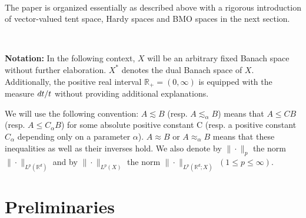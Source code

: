 \documentclass[oneside,english,a4wide]{amsart}
\numberwithin{equation}{section}
\numberwithin{figure}{section}
\theoremstyle{plain}
\theoremstyle{plain}
\theoremstyle{definition}
\theoremstyle{plain}
\theoremstyle{remark}
\theoremstyle{definition}
\theoremstyle{remark}
\theoremstyle{definition}
\newcommand{\real}{{\mathbb R}}
\newcommand{\F}{{\mathcal F}}
\newcommand{\8}{+\infty}
\renewcommand{\1}{\mathbbm{1}}
\renewcommand\d{{\rm d}}
\begin{document}




\

The paper is organized essentially as described above with a rigorous introduction of vector-valued tent space, Hardy spaces and BMO spaces in the next section.

\

{\bf Notation:}  In the following context, $X$ will be an arbitrary fixed Banach space without further elaboration. $X^*$ denotes the dual Banach space of $X$. Additionally, the positive real interval $\mathbb{R}_+ = (0, \infty)$ is equipped with the measure $\d t/t$ without providing additional explanations.

We will use the following convention: $ A \lesssim B $ (resp. $ A \lesssim_\alpha B $) means that $ A \leq CB $ (resp. $ A \leq C_\alpha B $) for some absolute positive constant C (resp. a positive constant $C_{\alpha}$ depending only on a parameter $\alpha$). $ A \approx B $ or $ A\approx_\alpha B $ means that these inequalities as well as their inverses hold. We also denote by $ \| \cdot \|_p $ the norm $ \| \cdot \|_{L^p(\real^d)} $ and by $\| \cdot \|_{L^p(X)}$ the norm $\| \cdot \|_{L^p(\real^d; X)}$ $(1 \leq p \leq \infty)$. 

\section{Preliminaries}\label{Preliminaries}


\end{document}
